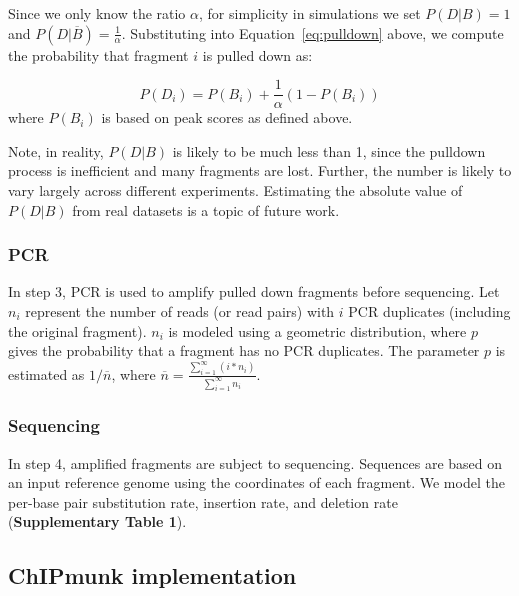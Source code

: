 \documentclass[12pt]{article}
\begin{document}
Since we only know the ratio $\alpha$, for simplicity in simulations we set $P(D|B)=1$ and $P(D|\overline{B})=\frac{1}{\alpha}$.
Substituting into Equation~\ref{eq:pulldown} above, we compute the probability that fragment $i$ is pulled down as:

\begin{equation}
  P(D_i) = P(B_i) + \frac{1}{\alpha}(1-P(B_i))
\end{equation}
where $P(B_i)$ is based on peak scores as defined above.

Note, in reality, $P(D|B)$ is likely to be much less than 1, since the pulldown process is inefficient and many fragments are lost.
Further, the number is likely to vary largely across different experiments.
Estimating the absolute value of $P(D|B)$ from real datasets is a topic of future work.

\subsubsection*{PCR}

In step 3, PCR is used to amplify pulled down fragments before sequencing.
Let $n_i$ represent the number of reads (or read pairs) with $i$ PCR duplicates (including the original fragment).
$n_i$ is modeled using a geometric distribution, where $p$ gives the probability that a fragment has no PCR duplicates.
The parameter $p$ is estimated as $1/\overline{n}$, where $\overline{n} = \frac{\sum_{i=1}^\infty (i* n_i)}{\sum_{i=1}^\infty n_i}$.

\subsubsection*{Sequencing}

In step 4, amplified fragments are subject to sequencing.
Sequences are based on an input reference genome using the coordinates of each fragment.
We model the per-base pair substitution rate, insertion rate, and deletion rate (\textbf{Supplementary Table 1}).

\subsection*{ChIPmunk implementation}
\end{document}
